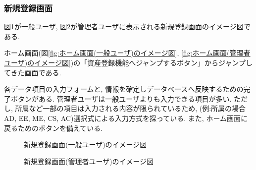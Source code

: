 \documentclass[11ptm]{jsarticle}
\begin{document}
\clearpage
\subsubsection{新規登録画面}
\label{sec:新規登録画面}
図\ref{fig:新規登録画面(一般ユーザ)のイメージ図}が一般ユーザ, 図\ref{fig:新規登録画面(管理者ユーザ)のイメージ図}が管理者ユーザに表示される新規登録画面のイメージ図である. \par
ホーム画面(図\ref{fig:ホーム画面(一般ユーザ)のイメージ図}, \ref{fig:ホーム画面(管理者ユーザ)のイメージ図})の「資産登録機能へジャンプするボタン」からジャンプしてきた画面である. \par
各データ項目の入力フォームと, 情報を確定しデータベースへ反映するための完了ボタンがある. 管理者ユーザは一般ユーザよりも入力できる項目が多い. ただし, 所属など一部の項目は入力される内容が限られているため, (例:所属の場合AD, EE, ME, CS, AC)選択式による入力方式を採っている. また, ホーム画面に戻るためのボタンを備えている.
\begin{figure}[h]
  \centering
  \caption{\label{fig:新規登録画面(一般ユーザ)のイメージ図}新規登録画面(一般ユーザ)のイメージ図}
\end{figure}
\begin{figure}[h]
  \centering
  \caption{\label{fig:新規登録画面(管理者ユーザ)のイメージ図}新規登録画面(管理者ユーザ)のイメージ図}
\end{figure}
\end{document}
